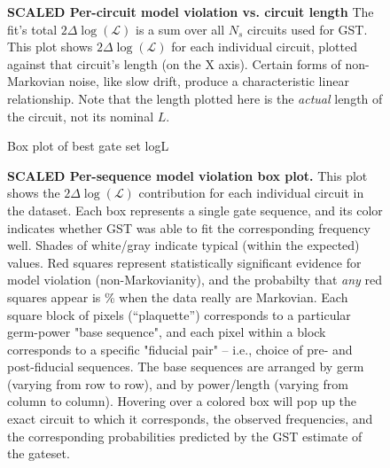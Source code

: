 \documentclass{article}[11pt]
\newcommand{\putfield}[2]{#2}
\begin{document}
{{{\begin{figure}
  \begin{center}
    \begin{adjustbox}{max width=\textwidth}
      \putfield{bestEstimateColorScatterPlot_scl}{}
    \end{adjustbox}
    \caption{\textbf{SCALED Per-circuit model violation vs. circuit length} The fit's total $2\Delta\log(\mathcal{L})$ is a sum over all $N_s$ circuits used for GST.  This plot shows $2\Delta\log(\mathcal{L})$ for each individual circuit, plotted against that circuit's length (on the X axis).  Certain forms of non-Markovian noise, like slow drift, produce a characteristic linear relationship.  Note that the length plotted here is the \emph{actual} length of the circuit, not its nominal $L$.}
  \end{center}
\end{figure}

\begin{figure}
  \begin{center}
    \begin{adjustbox}{max width=\textwidth}
      \putfield{bestEstimateColorBoxPlotPages_scl}{Box plot of best gate set logL}
    \end{adjustbox}
    \caption{\textbf{SCALED Per-sequence model violation box plot.}  This plot shows the $2\Delta\log(\mathcal{L})$ contribution for each individual circuit in the dataset.  Each box represents a single gate sequence, and its color indicates whether GST was able to fit the corresponding frequency well.  Shades of white/gray indicate typical (within the expected) values. Red squares represent statistically significant evidence for model violation (non-Markovianity), and the probabilty that \emph{any} red squares appear is \putfield{linlg_pcntle}{}\% when the data really are Markovian. Each square block of pixels (``plaquette'') corresponds to a particular germ-power "base sequence", and each pixel within a block corresponds to a specific "fiducial pair" -- i.e., choice of pre- and post-fiducial sequences.  The base sequences are arranged by germ (varying from row to row), and by power/length (varying from column to column).  Hovering over a colored box will pop up the exact circuit to which it corresponds, the observed frequencies, and the corresponding probabilities predicted by the GST estimate of the gateset.\label{bestEstimateColorBoxPlot}}
\end{center}
\end{figure}

}}}
\end{document}
